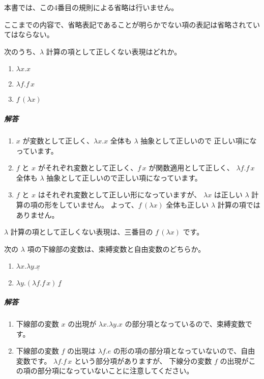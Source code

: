 本書では、この4番目の規則による省略は行いません。

\begin{note}
ここまでの内容で、省略表記であることが明らかでない項の表記は省略されていてはならない。
\end{note}

\begin{exercise}

次のうち、$\lambda$ 計算の項として正しくない表現はどれか。

\begin{enumerate}
  \item $\lambda x . x$
  \item $\lambda f . f \, x$
  \item $f \, (\lambda x)$
\end{enumerate}

\subparagraph{解答}

\begin{enumerate}
  \item $x$ が変数として正しく、$\lambda x . x$ 全体も $\lambda$ 抽象として正しいので
        正しい項になっています。
  \item $f$ と $x$ がそれぞれ変数として正しく、$f \, x$ が関数適用として正しく、
        $\lambda f . f \, x$ 全体も $\lambda$ 抽象として正しいので正しい項になっています。
  \item $f$ と $x$ はそれぞれ変数として正しい形になっていますが、
        $\lambda x$ は正しい $\lambda$ 計算の項の形をしていません。
        よって、$f \, (\lambda x)$ 全体も正しい $\lambda$ 計算の項ではありません。
\end{enumerate}

$\lambda$ 計算の項として正しくない表現は、三番目の $f \, (\lambda x)$ です。

\end{exercise}

\begin{exercise}

次の $\lambda$ 項の下線部の変数は、束縛変数と自由変数のどちらか。

\begin{enumerate}
  \item $\lambda x . \lambda y . \underline{x}$
  \item $\lambda y . (\lambda f . f \, x) \, \underline{f}$
\end{enumerate}

\subparagraph{解答}

\begin{enumerate}
  \item 下線部の変数 $x$ の出現が $\lambda x . \lambda y . x$ の部分項となっているので、束縛変数です。
  \item 下線部の変数 $f$ の出現は $\lambda f . e$ の形の項の部分項となっていないので、自由変数です。
        $\lambda f . f \, x$ という部分項がありますが、
        下線分の変数 $f$ の出現がこの項の部分項になっていないことに注意してください。
\end{enumerate}

\end{exercise}

